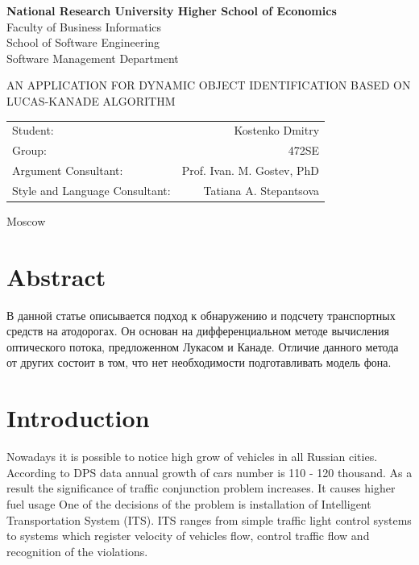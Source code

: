 \documentclass[12pt,a4paper,oneside,titlepage]{article}
\author{Kostenko}
\begin{document}
{
\thispagestyle{empty}
\newpage
\centering

\textbf{
National Research University Higher School of Economics\\
}
Faculty of Business Informatics\\
School of Software Engineering\\
Software Management Department

\vfill


\begin{large}
\MakeTextUppercase{
An Application for Dynamic Object Identification Based on Lucas-Kanade Algorithm
}
\end{large}


\vfill

\begin{tabular}{lr}
Student: & Kostenko Dmitry \\
Group: & 472SE \\
Argument Consultant: & Prof. Ivan. M. Gostev, PhD \\
Style and Language Consultant: & Tatiana A. Stepantsova
\end{tabular}

\vspace{\fill}

Moscow\\ \number\year
\clearpage
}

\section*{Abstract}
{
В данной статье описывается подход к обнаружению и подсчету транспортных средств на атодорогах.
Он основан на дифференциальном методе вычисления оптического потока, предложенном Лукасом и Канаде.
Отличие данного метода от других состоит в том, что нет необходимости подготавливать модель фона.
}









{
\newpage
\centering
\tableofcontents
}











\newpage
\section*{Introduction}
Nowadays it is possible to notice high grow of vehicles in all Russian cities.
According to DPS data annual growth of cars number is 110 - 120 thousand.
As a result the significance of traffic conjunction problem increases.
It causes higher fuel usage 
One of the decisions of the problem is installation of Intelligent Transportation System (ITS).
ITS ranges from simple traffic light control systems to systems which register velocity of vehicles flow, control traffic flow and recognition of the violations.
\end{document}
